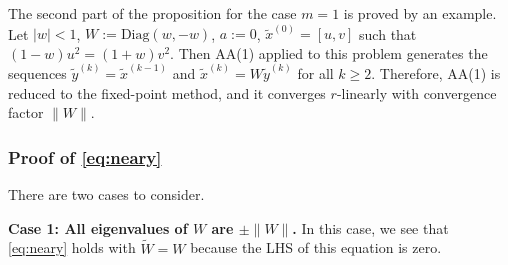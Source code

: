 \documentclass[11pt]{article}
\begin{document}
{{The second part of the proposition for the case $m=1$ is proved by an example. Let $|w|<1$, $W:=\text{Diag}(w,-w)$, $a:={0}$, $\widetilde{x}^{(0)}=[u,v]$ such that $(1-w)u^2=(1+w)v^2$. Then AA(1) applied to this problem generates the sequences $\widetilde{y}^{(k)}=\widetilde{x}^{(k-1)}$ and $\widetilde{x}^{(k)}=W\widetilde{y}^{(k)}$ for all $k\geq 2$. Therefore, AA(1) is reduced to the fixed-point method, and it converges $r$-linearly with convergence factor $\|W\|$. 

\subsubsection{Proof of \eqref{eq:neary}}\label{sec:proof_neary}
There are two cases to consider. 

\textbf{Case 1: All eigenvalues of $W$ are $\pm\|W\|$.}
In this case, we see that  \eqref{eq:neary} holds with $\widetilde{W}=W$ because the LHS of this equation is zero. 

}}
\end{document}

